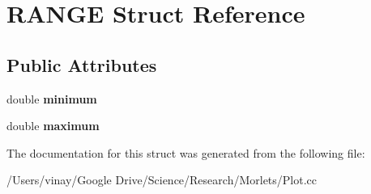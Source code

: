 \hypertarget{struct_r_a_n_g_e}{}\section{R\+A\+N\+G\+E Struct Reference}
\label{struct_r_a_n_g_e}
\subsection*{Public Attributes}
\begin{DoxyCompactItemize}
\item 
\hypertarget{struct_r_a_n_g_e_a0581cee8c7a8c493e91c0d3435d26db9}{}double {\bfseries minimum}\label{struct_r_a_n_g_e_a0581cee8c7a8c493e91c0d3435d26db9}

\item 
\hypertarget{struct_r_a_n_g_e_a5fa7dd36152d33805f4dee7100ef2e5c}{}double {\bfseries maximum}\label{struct_r_a_n_g_e_a5fa7dd36152d33805f4dee7100ef2e5c}

\end{DoxyCompactItemize}


The documentation for this struct was generated from the following file\+:\begin{DoxyCompactItemize}
\item 
/\+Users/vinay/\+Google Drive/\+Science/\+Research/\+Morlets/Plot.\+cc\end{DoxyCompactItemize}
